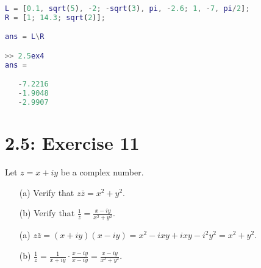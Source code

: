 \documentclass{report}
\begin{document}
\begin{lstlisting}[language=Matlab, caption={MATLAB code}, xleftmargin=\parindent]
L = [0.1, sqrt(5), -2; -sqrt(3), pi, -2.6; 1, -7, pi/2];
R = [1; 14.3; sqrt(2)];

ans = L\R

>> 2.5ex4
ans =

   -7.2216
   -1.9048
   -2.9907

\end{lstlisting}



\section*{2.5: Exercise 11} 

Let $z=x+iy$ be a complex number. 


\begin{enumerate}
    \item[(a)] Verify that $z\bar{z}=x^2+y^2.$
    \item[(b)] Verify that $\frac{1}{z}=\frac{x-iy}{x^2+y^2}.$
\end{enumerate}

\sol

\begin{enumerate}
\item[(a)] $z\bar{z} = (x + iy)(x - iy) = x^2 - ixy + ixy - i^2y^2 = \boxed{x^2 + y^2}$.

\item[(b)] $\frac{1}{z} = \frac{1}{x + iy} \cdot \frac{x - iy}{x - iy} = \boxed{\frac{x - iy}{x^2 + y^2}}$.
\end{enumerate}
\end{document}
